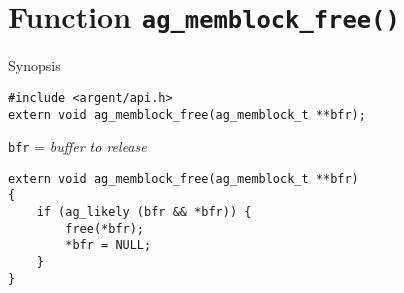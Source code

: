 %


\section{Function \texttt{ag\_memblock\_free()}}
  \begin{bclogo}[logo=\bccrayon, noborder=true, barre=snake, couleurBarre=gray]
    {Synopsis}
  \lstset{style=SYNOPSIS}
  \begin{lstlisting}[linewidth=1.0\linewidth]
#include <argent/api.h>
extern void ag_memblock_free(ag_memblock_t **bfr);
  \end{lstlisting}
  \scriptsize
  \texttt{bfr} = \emph{buffer to release} \\
  \end{bclogo}

\lstset{style=CODE}
\begin{lstlisting}[linewidth=1.0\linewidth,
    caption=Definition of ag\_memblock\_free()]
extern void ag_memblock_free(ag_memblock_t **bfr)
{
    if (ag_likely (bfr && *bfr)) {
        free(*bfr);
        *bfr = NULL;
    }
}

\end{lstlisting}

